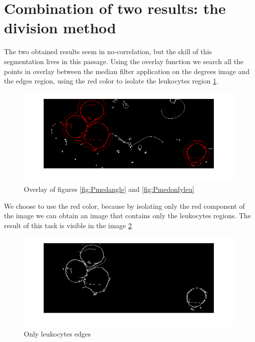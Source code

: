 \section{Combination of two results: the division method}
The two obtained results seem in no-correlation, but the skill of this segmentation lives in this passage. Using the overlay function we search all the points in overlay between the median filter application on the degrees image and the edges region, using the red color to isolate the leukocytes region \ref{fig:over}.
\begin{figure}
	\begin{center}
		\centering
		\includegraphics[scale=0.5]{img/overlay.png}
		\caption{Overlay of figures \ref{fig:Pmedangle} and \ref{fig:Pmedonlyleu}}
		\label{fig:over}
	\end{center}
\end{figure}
We choose to use the red color, because by isolating only the red component of the image we can obtain an image that contains only the leukocytes regions. The result of this task is visible in the image \ref{fig:leukoover} 
\begin{figure}
	\begin{center}
		\centering
		\includegraphics[scale=0.5]{img/overLeuko.png}
		\caption{Only leukocytes edges}
		\label{fig:leukoover}
	\end{center}
\end{figure}

